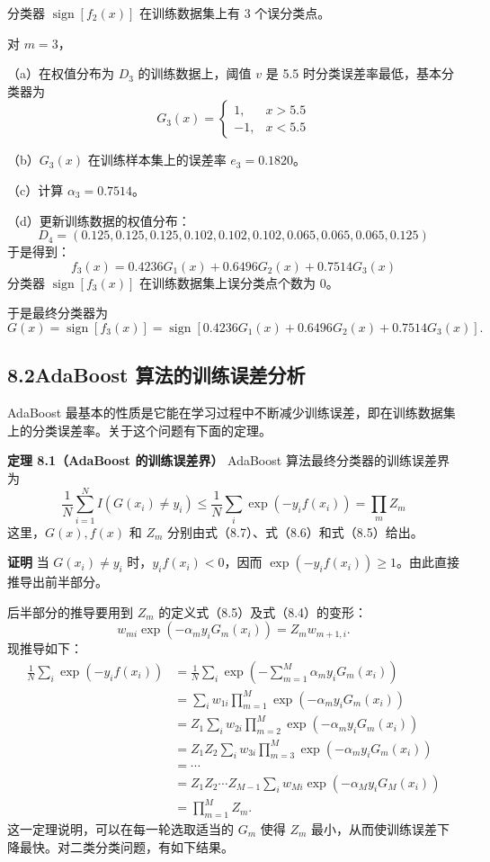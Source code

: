 \documentclass[UTF8, 12pt, fontset=fandol, oneside]{ctexart}
\begin{document}
分类器 $\operatorname{sign}[f_2(x)]$ 在训练数据集上有 3 个误分类点。

对 $m=3$，

（a）在权值分布为 $D_3$ 的训练数据上，阈值 $v$ 是 5.5 时分类误差率最低，基本分类器为
\[
G_3(x)=
\begin{cases}
1, & x>5.5\\
-1, & x<5.5
\end{cases}
\]

（b）$G_3(x)$ 在训练样本集上的误差率 $e_3=0.1820$。

（c）计算 $\alpha_3=0.7514$。

（d）更新训练数据的权值分布：
\[
D_4=(0.125,0.125,0.125,0.102,0.102,0.102,0.065,0.065,0.065,0.125)
\]
于是得到：
\[
f_3(x)=0.4236G_1(x)+0.6496G_2(x)+0.7514G_3(x)
\]
分类器 $\operatorname{sign}[f_3(x)]$ 在训练数据集上误分类点个数为 0。

于是最终分类器为
\[
G(x)=\operatorname{sign}[f_3(x)]
=\operatorname{sign}[0.4236G_1(x)+0.6496G_2(x)+0.7514G_3(x)].
\]

\subsection*{8.2\quad AdaBoost 算法的训练误差分析}

AdaBoost 最基本的性质是它能在学习过程中不断减少训练误差，即在训练数据集上的分类误差率。关于这个问题有下面的定理。

\noindent\textbf{定理 8.1（AdaBoost 的训练误差界）}\quad
AdaBoost 算法最终分类器的训练误差界为
\begin{equation}
\frac{1}{N}\sum_{i=1}^N I(G(x_i)\ne y_i)
\leq \frac{1}{N}\sum_i \exp(-y_if(x_i))=\prod_m Z_m
\tag{8.9}
\end{equation}
这里，$G(x),f(x)$ 和 $Z_m$ 分别由式（8.7）、式（8.6）和式（8.5）给出。

\noindent\textbf{证明}\quad
当 $G(x_i)\ne y_i$ 时，$y_if(x_i)<0$，因而 $\exp(-y_if(x_i))\geq 1$。由此直接推导出前半部分。

后半部分的推导要用到 $Z_m$ 的定义式（8.5）及式（8.4）的变形：
\[
w_{mi}\exp(-\alpha_my_iG_m(x_i))=Z_mw_{m+1,i}.
\]
现推导如下：
\[
\begin{aligned}
\frac{1}{N}\sum_i \exp(-y_if(x_i))
&=\frac{1}{N}\sum_i \exp\left(-\sum_{m=1}^M \alpha_my_iG_m(x_i)\right)\\
&=\sum_i w_{1i}\prod_{m=1}^M \exp(-\alpha_my_iG_m(x_i))\\
&=Z_1\sum_i w_{2i}\prod_{m=2}^M \exp(-\alpha_my_iG_m(x_i))\\
&=Z_1Z_2\sum_i w_{3i}\prod_{m=3}^M \exp(-\alpha_my_iG_m(x_i))\\
&=\cdots\\
&=Z_1Z_2\cdots Z_{M-1}\sum_i w_{Mi}\exp(-\alpha_My_iG_M(x_i))\\
&=\prod_{m=1}^M Z_m.
\end{aligned}
\]
这一定理说明，可以在每一轮选取适当的 $G_m$ 使得 $Z_m$ 最小，从而使训练误差下降最快。对二类分类问题，有如下结果。
\end{document}
